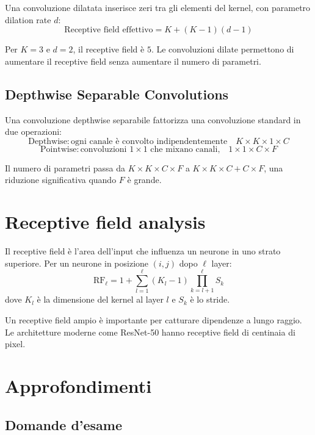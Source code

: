 Una convoluzione dilatata inserisce zeri tra gli elementi del kernel, con parametro dilation rate $d$:
\[
\text{Receptive field effettivo} = K + (K-1)(d-1)
\]

Per $K=3$ e $d=2$, il receptive field è $5$. Le convoluzioni dilate permettono di aumentare il receptive field senza aumentare il numero di parametri.

\subsection{Depthwise Separable Convolutions}

Una convoluzione depthwise separabile fattorizza una convoluzione standard in due operazioni:
\[
\text{Depthwise}: \text{ogni canale è convolto indipendentemente} \quad K \times K \times 1 \times C
\]
\[
\text{Pointwise}: \text{convoluzioni } 1 \times 1 \text{ che mixano canali,} \quad 1 \times 1 \times C \times F
\]

Il numero di parametri passa da $K \times K \times C \times F$ a $K \times K \times C + C \times F$, una riduzione significativa quando $F$ è grande.

\section{Receptive field analysis}

Il receptive field è l'area dell'input che influenza un neurone in uno strato superiore. Per un neurone in posizione $(i,j)$ dopo $\ell$ layer:
\[
\text{RF}_\ell = 1 + \sum_{l=1}^{\ell} (K_l - 1) \prod_{k=l+1}^{\ell} S_k
\]
dove $K_l$ è la dimensione del kernel al layer $l$ e $S_k$ è lo stride.

Un receptive field ampio è importante per catturare dipendenze a lungo raggio. Le architetture moderne come ResNet-50 hanno receptive field di centinaia di pixel.

\section{Approfondimenti}

\subsection{Domande d'esame}

